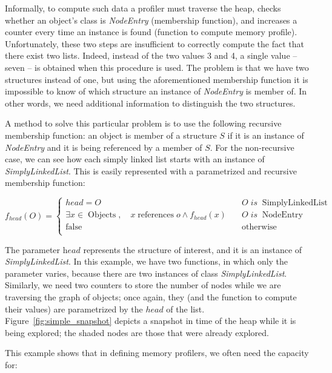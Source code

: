 Informally, to compute such data a profiler must traverse the heap, checks whether an object's class is \textit{NodeEntry} (membership function), and increases a counter every time an instance is found (function to compute memory profile).
Unfortunately, these two steps are insufficient to correctly compute the fact that there exist two lists.
Indeed,  instead of the two values 3 and 4, a single value -- seven -- is obtained when this procedure is used.
The problem is that we have two structures instead of one, but using the aforementioned membership function it is impossible to know of which structure an instance of \textit{NodeEntry} is member of.
In other words, we need additional information to distinguish the two structures.

A method to solve this particular problem is to use the following recursive membership function: an object is member of a structure $S$ if it is an instance of \textit{NodeEntry} and it is being referenced by a member of $S$.
For the non-recursive case, we can see how each simply linked list starts with an instance of \textit{SimplyLinkedList}.
This is easily represented with a parametrized and recursive membership function:

\[
	f_{head}\left(O\right) = 
	\begin{cases}
		head = O & \quad O \; is \; \operatorname{SimplyLinkedList} \\
		\exists {x \in \operatorname{Objects}}, \quad x \operatorname{references} o \wedge f_{head}\left(x\right) & \quad O \; is \; \operatorname{NodeEntry} \\
		\operatorname{false} & \quad \operatorname{otherwise} \\
	\end{cases}
\]

The parameter $\textit{head}$ represents the structure of interest, and it is an instance of \textit{SimplyLinkedList}.
In this example, we have two functions, in which only the parameter varies, because there are two instances of class \textit{SimplyLinkedList}.
Similarly, we need two counters to store the number of nodes while we are traversing the graph of objects; once again, they (and the function to compute their values) are parametrized by the $head$ of the list.
Figure~\ref{fig:simple_snapshot} depicts a snapshot in time of the heap while it is being explored;
the shaded nodes are those that were already explored.

This example shows that in defining memory profilers, we often need the capacity for:

